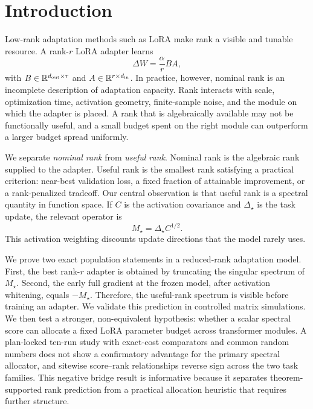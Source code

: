 \documentclass[10pt,twocolumn]{article}
\theoremstyle{definition}
\begin{document}
\section{Introduction}
\label{sec:intro}

Low-rank adaptation methods such as LoRA make rank a visible and tunable resource.  A rank-$r$ LoRA adapter learns
\begin{equation}
    \Delta W = \frac{\alpha}{r}BA,
\end{equation}
with $B\in\mathbb R^{d_{\rm out}\times r}$ and $A\in\mathbb R^{r\times d_{\rm in}}$.  In practice, however, nominal rank is an incomplete description of adaptation capacity.  Rank interacts with scale, optimization time, activation geometry, finite-sample noise, and the module on which the adapter is placed.  A rank that is algebraically available may not be functionally useful, and a small budget spent on the right module can outperform a larger budget spread uniformly.

We separate \emph{nominal rank} from \emph{useful rank}.  Nominal rank is the algebraic rank supplied to the adapter.  Useful rank is the smallest rank satisfying a practical criterion: near-best validation loss, a fixed fraction of attainable improvement, or a rank-penalized tradeoff.  Our central observation is that useful rank is a spectral quantity in function space.  If $C$ is the activation covariance and $\Delta_\star$ is the task update, the relevant operator is
\begin{equation}
    M_\star = \Delta_\star C^{1/2}.
\end{equation}
This activation weighting discounts update directions that the model rarely uses.

We prove two exact population statements in a reduced-rank adaptation model.  First, the best rank-$r$ adapter is obtained by truncating the singular spectrum of $M_\star$.  Second, the early full gradient at the frozen model, after activation whitening, equals $-M_\star$.  Therefore, the useful-rank spectrum is visible before training an adapter.  We validate this prediction in controlled matrix simulations.  We then test a stronger, non-equivalent hypothesis: whether a scalar spectral score can allocate a fixed LoRA parameter budget across transformer modules.  A plan-locked ten-run study with exact-cost comparators and common random numbers does not show a confirmatory advantage for the primary spectral allocator, and sitewise score--rank relationships reverse sign across the two task families.  This negative bridge result is informative because it separates theorem-supported rank prediction from a practical allocation heuristic that requires further structure.
\end{document}
